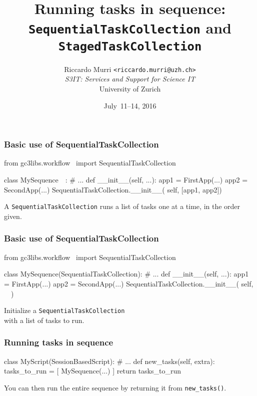 \documentclass[english,serif,mathserif,xcolor=pdftex,dvipsnames,table]{beamer}
\title[Sequencing tasks]{%
  Running tasks in sequence: \\
  \texttt{SequentialTaskCollection} and \texttt{StagedTaskCollection}
}
\author[R. Murri, S3IT UZH]{%
  Riccardo Murri \texttt{<riccardo.murri@uzh.ch>}
  \\[1ex]
  \emph{S3IT: Services and Support for Science IT}
  \\[1ex]
  University of Zurich
}
\date{July~11--14, 2016}
\begin{document}
\maketitle


\begin{frame}[fragile]
  \frametitle{Basic use of SequentialTaskCollection}

\begin{python}
from gc3libs.workflow \
  import SequentialTaskCollection

class MySequence~~:
  # ...
  def __init__(self, ...):
    app1 = FirstApp(...)
    app2 = SecondApp(...)
    SequentialTaskCollection.__init__(
      self, [app1, app2])
\end{python}

  \+
  A \texttt{SequentialTaskCollection} runs a list of tasks one at a time, in the order given.
\end{frame}


\begin{frame}[fragile]
  \frametitle{Basic use of SequentialTaskCollection}

\begin{python}
from gc3libs.workflow \
  import SequentialTaskCollection

class MySequence(SequentialTaskCollection):
  # ...
  def __init__(self, ...):
    app1 = FirstApp(...)
    app2 = SecondApp(...)
    SequentialTaskCollection.__init__(
      self, ~~)
\end{python}

  \+
  Initialize a \texttt{SequentialTaskCollection} \\
  with a list of tasks to run.
\end{frame}


\begin{frame}[fragile]
  \frametitle{Running tasks in sequence}

\begin{python}
class MyScript(SessionBasedScript):
  # ...
  def new_tasks(self, extra):
    tasks_to_run = [
      MySequence(...)
    ]
    return tasks_to_run
\end{python}

  \+ You can then run the entire sequence by returning it from
  \lstinline|new_tasks()|.
\end{frame}
\end{document}
